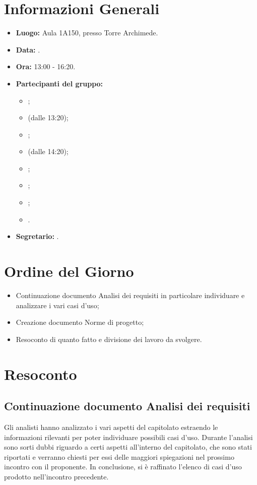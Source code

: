 \section{Informazioni Generali}
\begin{itemize}
\item \textbf{Luogo:} Aula 1A150, presso Torre Archimede.
\item \textbf{Data:} \Data.
\item \textbf{Ora:} 13:00 - 16:20.
\item \textbf{Partecipanti del gruppo:}
	\begin{itemize}
		\item \AT{}; 
		\item \BR{} (dalle 13:20);
		\item \CE{}; 
		\item \DF{} (dalle 14:20);
		\item \LD{};
		\item \MC{};
		\item \PF{};
		\item \SE{}.
	\end{itemize} 
\item \textbf{Segretario:} \MC{}.
\end{itemize}


\section{Ordine del Giorno}
\begin{itemize}
	\item Continuazione documento Analisi dei requisiti in particolare individuare e analizzare i vari casi d'uso;
	\item Creazione documento Norme di progetto;
	\item Resoconto di quanto fatto e divisione dei lavoro da svolgere.
\end{itemize}


\section{Resoconto}
\subsection{Continuazione documento Analisi dei requisiti}
Gli analisti hanno analizzato i vari aspetti del capitolato estraendo le informazioni rilevanti per poter individuare possibili casi d’uso. Durante l’analisi sono sorti dubbi riguardo a certi aspetti all’interno del capitolato, che sono stati riportati e verranno chiesti per essi delle maggiori spiegazioni nel prossimo incontro con il proponente. In conclusione, si è raffinato l’elenco di casi d’uso prodotto nell’incontro precedente.

